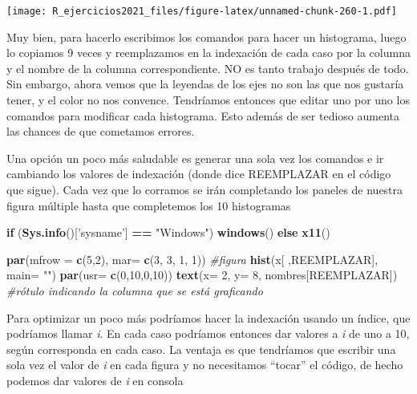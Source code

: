 \documentclass[]{book}
\newenvironment{Shaded}{\begin{snugshade}}{\end{snugshade}}
\newcommand{\CommentTok}[1]{\textcolor[rgb]{0.56,0.35,0.01}{\textit{#1}}}
\newcommand{\ControlFlowTok}[1]{\textcolor[rgb]{0.13,0.29,0.53}{\textbf{#1}}}
\newcommand{\DataTypeTok}[1]{\textcolor[rgb]{0.13,0.29,0.53}{#1}}
\newcommand{\DecValTok}[1]{\textcolor[rgb]{0.00,0.00,0.81}{#1}}
\newcommand{\KeywordTok}[1]{\textcolor[rgb]{0.13,0.29,0.53}{\textbf{#1}}}
\newcommand{\NormalTok}[1]{#1}
\newcommand{\OperatorTok}[1]{\textcolor[rgb]{0.81,0.36,0.00}{\textbf{#1}}}
\newcommand{\StringTok}[1]{\textcolor[rgb]{0.31,0.60,0.02}{#1}}
\begin{document}
\texttt{[image: R\_ejercicios2021\_files/figure-latex/unnamed-chunk-260-1.pdf]}

Muy bien, para hacerlo escribimos los comandos para hacer un histograma, luego lo copiamos 9 veces y reemplazamos en la indexación de cada caso por la columna y el nombre de la columna correspondiente. NO es tanto trabajo después de todo. Sin embargo, ahora vemos que la leyendas de los ejes no son las que nos gustaría tener, y el color no nos convence. Tendríamos entonces que editar uno por uno los comandos para modificar cada histograma. Esto además de ser tedioso aumenta las chances de que cometamos errores.

Una opción un poco más saludable es generar una sola vez los comandos e ir cambiando los valores de indexación (donde dice REEMPLAZAR en el código que sigue). Cada vez que lo corramos se irán completando los paneles de nuestra figura múltiple hasta que completemos los 10 histogramas

\begin{Shaded}
\begin{Highlighting}[]
\ControlFlowTok{if}\NormalTok{ (}\KeywordTok{Sys.info}\NormalTok{()[}\StringTok{'sysname'}\NormalTok{] }\OperatorTok{==}\StringTok{ "Windows"}\NormalTok{) }\KeywordTok{windows}\NormalTok{() }\ControlFlowTok{else} \KeywordTok{x11}\NormalTok{() }

\KeywordTok{par}\NormalTok{(}\DataTypeTok{mfrow =} \KeywordTok{c}\NormalTok{(}\DecValTok{5}\NormalTok{,}\DecValTok{2}\NormalTok{), }\DataTypeTok{mar=} \KeywordTok{c}\NormalTok{(}\DecValTok{3}\NormalTok{, }\DecValTok{3}\NormalTok{, }\DecValTok{1}\NormalTok{, }\DecValTok{1}\NormalTok{))}
\CommentTok{#figura}
\KeywordTok{hist}\NormalTok{(x[ ,REEMPLAZAR], }\DataTypeTok{main=} \StringTok{""}\NormalTok{)}
\KeywordTok{par}\NormalTok{(}\DataTypeTok{usr=} \KeywordTok{c}\NormalTok{(}\DecValTok{0}\NormalTok{,}\DecValTok{10}\NormalTok{,}\DecValTok{0}\NormalTok{,}\DecValTok{10}\NormalTok{)) }
\KeywordTok{text}\NormalTok{(}\DataTypeTok{x=} \DecValTok{2}\NormalTok{, }\DataTypeTok{y=} \DecValTok{8}\NormalTok{, nombres[REEMPLAZAR]) }\CommentTok{#rótulo indicando la columna que se está graficando}
\end{Highlighting}
\end{Shaded}

Para optimizar un poco más podríamos hacer la indexación usando un índice, que podríamos llamar \emph{i}. En cada caso podríamos entonces dar valores a \emph{i} de uno a 10, según corresponda en cada caso. La ventaja es que tendríamos que escribir una sola vez el valor de \emph{i} en cada figura y no necesitamos ``tocar'' el código, de hecho podemos dar valores de \emph{i} en consola
\end{document}
